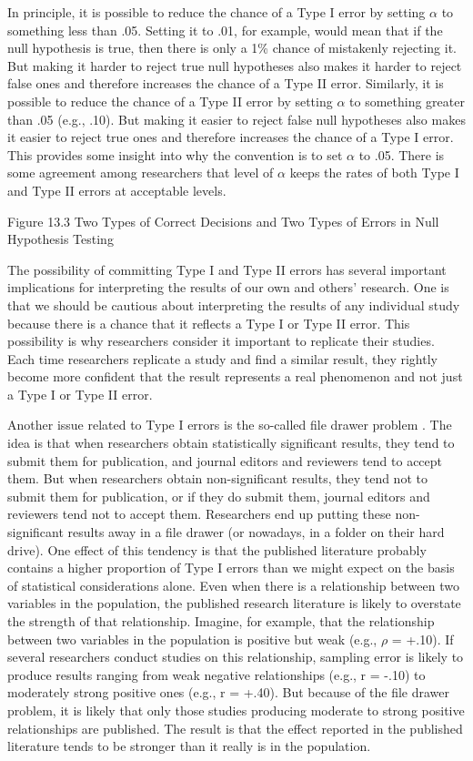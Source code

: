 In principle, it is possible to reduce the chance of a Type I error by setting $\alpha$ to something less than .05. Setting it to .01, for example, would mean that if the null hypothesis is true, then there is only a 1\% chance of mistakenly rejecting it. But making it harder to reject true null hypotheses also makes it harder to reject false ones and therefore increases the chance of a Type II error. Similarly, it is possible to reduce the chance of a Type II error by setting $\alpha$ to something greater than .05 (e.g., .10). But making it easier to reject false null hypotheses also makes it easier to reject true ones and therefore increases the chance of a Type I error. This provides some insight into why the convention is to set $\alpha$ to .05.  There is some agreement among researchers that level of $\alpha$ keeps the rates of both Type I and Type II errors at acceptable levels.

Figure 13.3 Two Types of Correct Decisions and Two Types of Errors in Null Hypothesis Testing


 The possibility of committing Type I and Type II errors has several important implications for interpreting the results of our own and others' research. One is that we should be cautious about interpreting the results of any individual study because there is a chance that it reflects a Type I or Type II error. This possibility is why researchers consider it important to replicate their studies. Each time researchers replicate a study and find a similar result, they rightly become more confident that the result represents a real phenomenon and not just a Type I or Type II error.

 
 Another issue related to Type I errors is the so-called file drawer problem \citep{rosenthal_file_1979}. The idea is that when researchers obtain statistically significant results, they tend to submit them for publication, and journal editors and reviewers tend to accept them. But when researchers obtain non-significant results, they tend not to submit them for publication, or if they do submit them, journal editors and reviewers tend not to accept them. Researchers end up putting these non-significant results away in a file drawer (or nowadays, in a folder on their hard drive). One effect of this tendency is that the published literature probably contains a higher proportion of Type I errors than we might expect on the basis of statistical considerations alone. Even when there is a relationship between two variables in the population, the published research literature is likely to overstate the strength of that relationship. Imagine, for example, that the relationship between two variables in the population is positive but weak (e.g., $\rho$ = +.10). If several researchers conduct studies on this relationship, sampling error is likely to produce results ranging from weak negative relationships (e.g., r = -.10) to moderately strong positive ones (e.g., r = +.40). But because of the file drawer problem, it is likely that only those studies producing moderate to strong positive relationships are published. The result is that the effect reported in the published literature tends to be stronger than it really is in the population.

